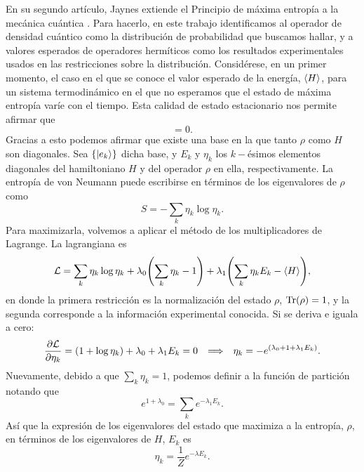 En su segundo artículo, Jaynes extiende el Principio de máxima entropía a la mecánica cuántica \cite{JaynesII}. Para hacerlo, en este trabajo identificamos al operador de densidad cuántico como la distribución de probabilidad que buscamos hallar, y a valores esperados de operadores hermíticos como los resultados experimentales usados en las restricciones sobre la distribución. Considérese, en un primer momento, el caso en el que se conoce el valor esperado de la energía, $\expval{H}$, para un sistema termodinámico en el que no esperamos que el estado de máxima entropía varíe con el tiempo. Esta calidad de estado estacionario nos permite afirmar que
\begin{equation*}
    [\rho,H]=0.
\end{equation*}
Gracias a esto podemos afirmar que existe una base en la que tanto $\rho$ como $H$ son diagonales. Sea $\{\ket{e_{k}}\}$ dicha base, y $E_{k}$ y $\eta_{k}$ los $k-$ésimos elementos diagonales del hamiltoniano $H$ y del operador $\rho$ en ella, respectivamente. La entropía de von Neumann puede escribirse en términos de los eigenvalores de $\rho$ como
\begin{equation*}
    S=-\sum_{k}\eta_{k}\log{\eta_{k}}.
\end{equation*}
Para maximizarla, volvemos a aplicar el método de los multiplicadores de Lagrange. La lagrangiana es
\begin{equation*}
    \mathcal{L}=\sum_{k}\eta_{k}\log{\eta_{k}}+\lambda_{0}\qty(\sum_{k}\eta_{k}-1)+\lambda_{1}\qty(\sum_{k}\eta_{k}E_{k}-\expval{H}),
\end{equation*}
en donde la primera restricción es la normalización del estado $\rho$, $\Tr(\rho)=1$, y la segunda corresponde a la información experimental conocida. Si se deriva e iguala a cero:
\begin{align*}
    \frac{\partial \mathcal{L}}{\partial \eta_{k}}=(1+\log{\eta_{k}})+\lambda_{0}+\lambda_{1}E_{k}=0 & & \Longrightarrow  & &\eta_{k}=-e^{(\lambda_{0}+1+\lambda_{1}E_{k})}.
\end{align*}
Nuevamente, debido a que $\sum_{k}\eta_{k}=1$, podemos definir a la función de partición notando que
\begin{equation*}
    e^{1+\lambda_{0}}=\sum_{k}e^{-\lambda_{1}E_{k}}.
\end{equation*}
Así que la expresión de los eigenvalores del estado que maximiza a la entropía, $\rho$, en términos de los eigenvalores de $H$, $E_{k}$ es
\begin{equation*}
    \eta_{k}=\frac{1}{Z}e^{-\lambda E_{k}}.
\end{equation*}
